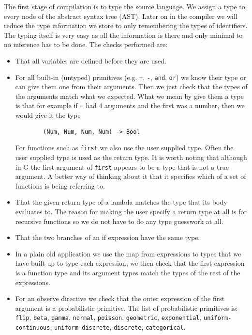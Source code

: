 \documentclass[a4paper]{article}
\begin{document}
The first stage of compilation is to type the source language. We assign a type to every node of the abstract syntax tree (AST). Later on in the compiler we will reduce the type information we store to only remembering the types of identifiers. The typing itself is very easy as all the information is there and only minimal to no inference has to be done. The checks performed are:
\begin{itemize}
\item
	That all variables are defined before they are used.

\item
	For all built-in (untyped) primitives (e.g. \texttt{+}, \texttt{-}, \texttt{and}, \texttt{or}) we know their type or can give them one from their arguments. Then we just check that the types of the arguments match what we expected. What we mean by give them a type is that for example if \texttt{=} had 4 arguments and the first was a number, then we would give it the type
	\begin{verbatim}
		(Num, Num, Num, Num) -> Bool
	\end{verbatim}
	For functions such as \texttt{first} we also use the user supplied type. Often the user supplied type is used as the return type. It is worth noting that although in G the first argument of \texttt{first} appears to be a type that is not a true argument. A better way of thinking about it that it specifies which of a set of functions is being referring to.

\item
	That the given return type of a lambda matches the type that its body evaluates to. The reason for making the user specify a return type at all is for recursive functions so we do not have to do any type guesswork at all.

\item
	That the two branches of an if expression have the same type.

\item
	In a plain old application we use the map from expressions to types that we have built up to type each expression, we then check that the first expression is a function type and its argument types match the types of the rest of the expressions.

\item
	For an observe directive we check that the outer expression of the first argument is a probabilistic primitive. The list of probabilistic primitives is: \texttt{flip}, \texttt{beta}, \texttt{gamma}, \texttt{normal}, \texttt{poisson}, \texttt{geometric}, \texttt{exponential}, \texttt{uniform-continuous}, \texttt{uniform-discrete}, \texttt{discrete}, \texttt{categorical}.

\end{itemize}
\end{document}
